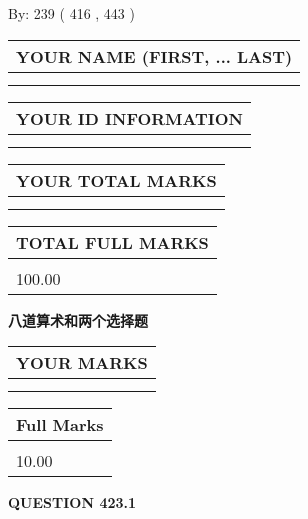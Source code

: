 \documentclass{ctexart}
\begin{document}
   
\hspace{1.0in} By: 
 239 ( 416 ,  443 )
   
   
   
   
\newpage 
\setcounter{page}{ 
   423001 } 
   
   
   
   
\noindent\begin{tabular}{|l|}
\hline
YOUR NAME (FIRST, ... LAST)  \\
\hline
 \\ 
 \\ 
\hline
\end{tabular}
\hspace{0.05in} \begin{tabular}{|l|}
\hline
 YOUR   ID   INFORMATION  \\
\hline
 \\ 
 \\ 
\hline
\end{tabular}
   
   
\vspace{0.2in}\noindent\begin{tabular}{|l|}
\hline
YOUR TOTAL MARKS  \\
\hline
 \\ 
 \\ 
\hline
\end{tabular}
\hspace{0.05in} \begin{tabular}{|l|}
\hline
TOTAL FULL MARKS  \\
\hline
 \\ 
100.00 \\
\hline
\end{tabular}
   
   
 \vspace{0.2in}
{\LARGE {\textbf{ 八道算术和两个选择题}}}
   
   
  
\vspace{0.2in}
  
\noindent\begin{tabular}{|l|}
\hline
 YOUR MARKS  \\
\hline
 \\ 
 \\ 
\hline
\end{tabular}
\hspace{0.05in} \begin{tabular}{|l|}
\hline
 Full Marks  \\
\hline
 \\ 
10.00 \\
\hline
\end{tabular}
{\textbf{\Large{QUESTION
423.1 
}}}
  
\end{document}
